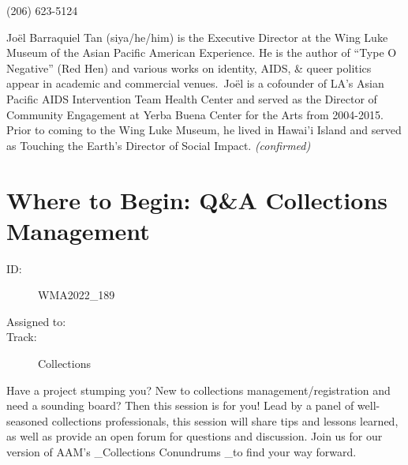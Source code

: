 \documentclass{report}
\begin{document}
                (206) 623-5124\newline

                Joël Barraquiel Tan (siya/he/him) is the Executive Director at the Wing Luke Museum of the Asian Pacific American Experience. He is the author of “Type O Negative” (Red Hen) and various works on identity, AIDS, \& queer politics appear in academic and commercial venues. Joël is a cofounder of LA's Asian Pacific AIDS Intervention Team Health Center and served as the Director of Community Engagement at Yerba Buena Center for the Arts from 2004-2015. Prior to coming to the Wing Luke Museum, he lived in Hawai'i Island and served as Touching the Earth's Director of Social Impact.
                \emph{ (confirmed) }
              

              
        
          \newpage
          \section{ Where to Begin: Q&A Collections Management }
            \begin{description}
              \item [ID:]
              WMA2022\_189

              \item [Assigned to:]
                \item [Track:]Collections~
              \end{description}

              Have a project stumping you? New to collections management/registration and need a sounding board? Then this session is for you! Lead by a panel of well-seasoned collections professionals, this session will share tips and lessons learned, as well as provide an open forum for questions and discussion. Join us for our version of AAM’s \_Collections Conundrums \_to find your way forward.
\end{document}
